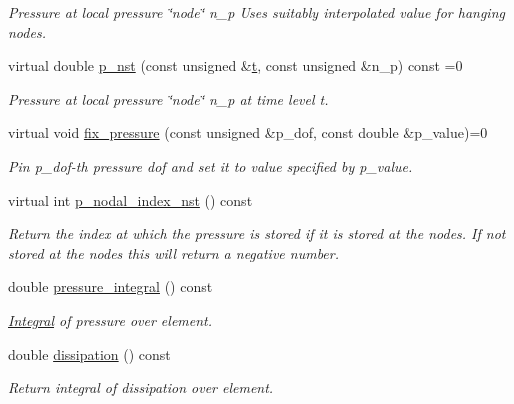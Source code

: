 \begin{DoxyCompactItemize}
\begin{DoxyCompactList}\small\item\em Pressure at local pressure \char`\"{}node\char`\"{} n\+\_\+p Uses suitably interpolated value for hanging nodes. \end{DoxyCompactList}\item 
virtual double \hyperlink{classoomph_1_1NavierStokesEquations_a0a39f638a61fd9a6c999c16e94deb31b}{p\+\_\+nst} (const unsigned \&\hyperlink{cfortran_8h_af6f0bd3dc13317f895c91323c25c2b8f}{t}, const unsigned \&n\+\_\+p) const =0
\begin{DoxyCompactList}\small\item\em Pressure at local pressure \char`\"{}node\char`\"{} n\+\_\+p at time level t. \end{DoxyCompactList}\item 
virtual void \hyperlink{classoomph_1_1NavierStokesEquations_aa33a3dd5c1cdba0a044e40ad290e487c}{fix\+\_\+pressure} (const unsigned \&p\+\_\+dof, const double \&p\+\_\+value)=0
\begin{DoxyCompactList}\small\item\em Pin p\+\_\+dof-\/th pressure dof and set it to value specified by p\+\_\+value. \end{DoxyCompactList}\item 
virtual int \hyperlink{classoomph_1_1NavierStokesEquations_a3694d3e2f09259cfda71547259f031ed}{p\+\_\+nodal\+\_\+index\+\_\+nst} () const
\begin{DoxyCompactList}\small\item\em Return the index at which the pressure is stored if it is stored at the nodes. If not stored at the nodes this will return a negative number. \end{DoxyCompactList}\item 
double \hyperlink{classoomph_1_1NavierStokesEquations_ad3305dc17d1cb9cec2771b88e4cdb4d2}{pressure\+\_\+integral} () const
\begin{DoxyCompactList}\small\item\em \hyperlink{classoomph_1_1Integral}{Integral} of pressure over element. \end{DoxyCompactList}\item 
double \hyperlink{classoomph_1_1NavierStokesEquations_af30c4ba5ebc5a97590cfafc076942472}{dissipation} () const
\begin{DoxyCompactList}\small\item\em Return integral of dissipation over element. \end{DoxyCompactList}\item 

\end{DoxyCompactItemize}
